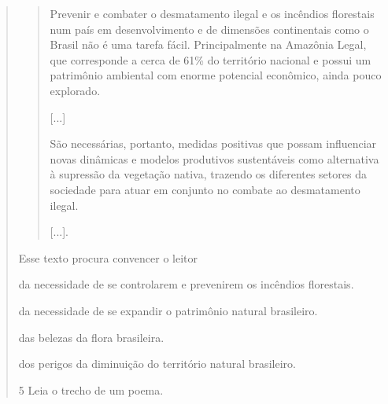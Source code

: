 \begin{quote}
\begin{quote}
Prevenir e combater o desmatamento ilegal e os incêndios florestais num
país em desenvolvimento e de dimensões continentais como o Brasil não é
uma tarefa fácil. Principalmente na Amazônia Legal, que corresponde a
cerca de 61\% do território nacional e possui um patrimônio ambiental
com enorme potencial econômico, ainda pouco explorado.

{[}...{]}

São necessárias, portanto, medidas positivas que possam influenciar
novas dinâmicas e modelos produtivos sustentáveis como alternativa à
supressão da vegetação nativa, trazendo os diferentes setores da
sociedade para atuar em conjunto no combate ao desmatamento ilegal.

{[}...{]}.

\end{quote}

Esse texto procura convencer o leitor

\begin{escolha}
\item da necessidade de se controlarem e prevenirem os incêndios florestais.

\item da necessidade de se expandir o patrimônio natural brasileiro.

\item das belezas da flora brasileira.

\item dos perigos da diminuição do território natural brasileiro.
\end{escolha}


\num{5} Leia o trecho de um poema.


\end{quote}
